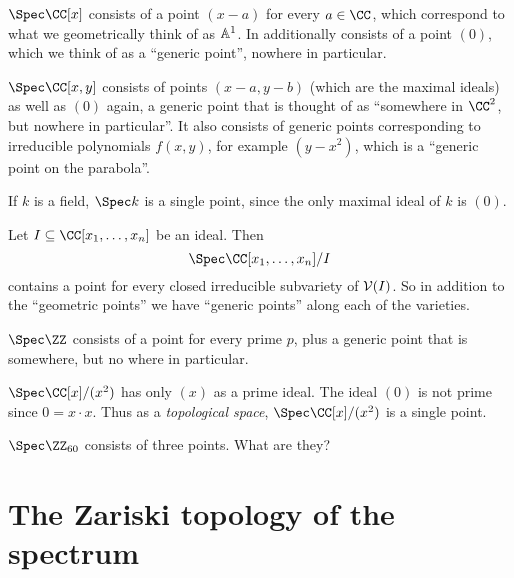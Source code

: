 \documentclass[11pt]{scrreprt}
\begin{document}
\begin{example}
	\listhack
	\begin{enumerate}[(a)]
		\ii $\Spec \CC[x]$ consists of a point $(x-a)$ for every $a \in \CC$,
		which correspond to what we geometrically think of as $\mathbb A^1$.
		In additionally consists of a point $(0)$,
		which we think of as a ``generic point'', nowhere in particular.

		\ii $\Spec \CC[x,y]$ consists of points $(x-a,y-b)$
		(which are the maximal ideals) as well as $(0)$ again, a generic
		point that is thought of as ``somewhere in $\CC^2$,
		but nowhere in particular''.
		It also consists of generic points corresponding to irreducible
		polynomials $f(x,y)$, for example $(y-x^2)$,
		which is a ``generic point on the parabola''.

		\ii If $k$ is a field, $\Spec k$ is a single point,
		since the only maximal ideal of $k$ is $(0)$.
	\end{enumerate}
\end{example}
\begin{example}
	Let $I \subseteq \CC[x_1, \dots, x_n]$ be an ideal.
	Then \[ \Spec \CC[x_1, \dots, x_n] /I \] contains a
	point for every closed irreducible subvariety of $\mathcal V(I)$.
	So in addition to the ``geometric points'' we have
	``generic points'' along each of the varieties.
\end{example}
\begin{example}
	\listhack
	\begin{enumerate}[(a)]
		\ii $\Spec \ZZ$ consists of a point for every prime $p$,
		plus a generic point that is somewhere, but no where in particular.

		\ii $\Spec \CC[x] / (x^2)$ has only $(x)$ as a prime ideal.
		The ideal $(0)$ is not prime since $0 = x \cdot x$.
		Thus as a \emph{topological space},
		$\Spec \CC[x] / (x^2)$ is a single point.
		
		\ii $\Spec \Zc{60}$ consists of three points.
		What are they?
	\end{enumerate}
\end{example}

\section{The Zariski topology of the spectrum}
\end{document}
